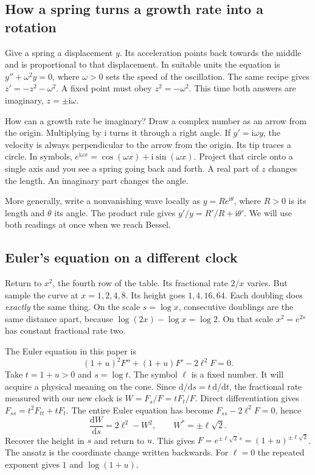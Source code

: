 \documentclass[11pt,a4paper]{amsart}
\newcommand{\dif}{\mathrm{d}}
\newcommand{\ii}{\mathrm{i}}
\theoremstyle{definition}
\theoremstyle{remark}
\begin{document}
\subsection{How a spring turns a growth rate into a rotation}
Give a spring a displacement \(y\). Its acceleration points back towards the middle and is proportional to that displacement. In suitable units the equation is \(y''+\omega^2 y=0\), where \(\omega>0\) sets the speed of the oscillation. The same recipe gives \(z'=-z^2-\omega^2\). A fixed point must obey \(z^2=-\omega^2\). This time both answers are imaginary, \(z=\pm\ii\omega\).

How can a growth rate be imaginary? Draw a complex number as an arrow from the origin. Multiplying by \(\ii\) turns it through a right angle. If \(y'=\ii\omega y\), the velocity is always perpendicular to the arrow from the origin. Its tip traces a circle. In symbols, \(e^{\ii\omega x}=\cos(\omega x)+\ii\sin(\omega x)\). Project that circle onto a single axis and you see a spring going back and forth. A real part of \(z\) changes the length. An imaginary part changes the angle.

More generally, write a nonvanishing wave locally as \(y=R e^{\ii\theta}\), where \(R>0\) is its length and \(\theta\) its angle. The product rule gives \(y'/y=R'/R+\ii\theta'\). We will use both readings at once when we reach Bessel.

\subsection{Euler's equation on a different clock}
Return to \(x^2\), the fourth row of the table. Its fractional rate \(2/x\) varies. But sample the curve at \(x=1,2,4,8\). Its height goes \(1,4,16,64\). Each doubling does \emph{exactly} the same thing. On the scale \(s=\log x\), consecutive doublings are the same distance apart, because \(\log(2x)-\log x=\log 2\). On that scale \(x^2=e^{2s}\) has constant fractional rate two.

The Euler equation in this paper is
\[
 (1+u)^2F''+(1+u)F'-2\ell^2 F=0.
\]
Take \(t=1+u>0\) and \(s=\log t\). The symbol \(\ell\) is a fixed number. It will acquire a physical meaning on the cone. Since \(\dif/\dif s=t\,\dif/\dif t\), the fractional rate measured with our new clock is \(W=F_s/F=tF_t/F\). Direct differentiation gives \(F_{ss}=t^2F_{tt}+tF_t\). The entire Euler equation has become \(F_{ss}-2\ell^2 F=0\), hence
\[
 \frac{\dif W}{\dif s}=2\ell^2-W^2,\qquad W^*=\pm\ell\sqrt2 .
\]
Recover the height in \(s\) and return to \(u\). This gives \(F=e^{\pm\ell\sqrt2\,s}=(1+u)^{\pm\ell\sqrt2}\). The ansatz is the coordinate change written backwards. For \(\ell=0\) the repeated exponent gives \(1\) and \(\log(1+u)\).
\end{document}
